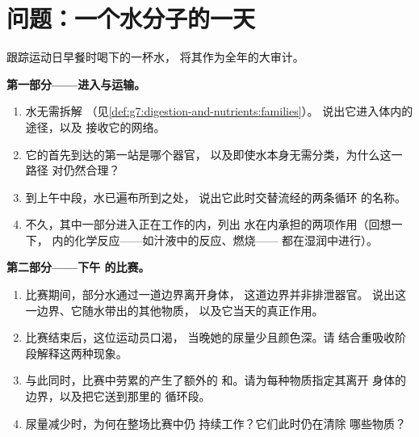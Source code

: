 \section{问题：一个水分子的一天}

\begin{problem}\label{pb:g7:removing-wastes:1}
跟踪运动日早餐时喝下的一杯水，
将其作为全年的大审计。

\medskip\noindent\textbf{第一部分——进入与运输。}
\begin{enumerate}
  \item 水无需拆解
        （见\cref{def:g7:digestion-and-nutrients:families}）。
        说出它进入体内的途径，以及
        接收它的网络。
  \item 它的首先到达的第一站是哪个器官，
        以及即使水本身无需分类，为什么这一路径
        对仍然合理？
  \item 到上午中段，水已遍布所到之处，
        说出它此时交替流经的两条循环
        的名称。
  \item 不久，其中一部分进入正在工作的内，列出
        水在内承担的两项作用（回想一下，
        内的化学反应——如汁液中的反应、燃烧——
        都在湿润中进行）。
\end{enumerate}

\medskip\noindent\textbf{第二部分——下午
的比赛。}
\begin{enumerate}[resume]
  \item 比赛期间，部分水通过一道边界离开身体，
        这道边界并非排泄器官。
        说出这一边界、它随水带出的其他物质，
        以及它当天的真正作用。
  \item 比赛结束后，这位运动员口渴，
        当晚她的尿量少且颜色深。请
        结合重吸收阶段解释这两种现象。
  \item 与此同时，比赛中劳累的产生了额外的
        和。请为每种物质指定其离开
        身体的边界，以及把它送到那里的
        循环段。
  \item 尿量减少时，为何在整场比赛中仍
        持续工作？它们此时仍在清除
        哪些物质？
\end{enumerate}


\end{problem}
